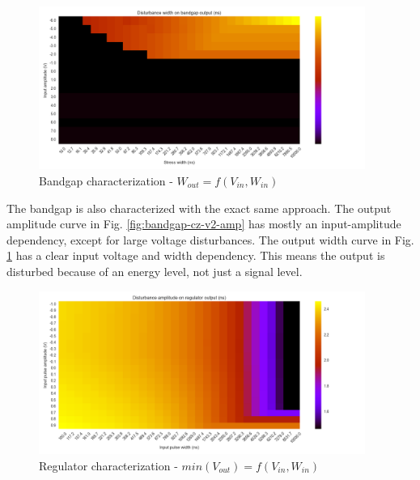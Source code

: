 \begin{figure}[!htb]
  \centering
  \includegraphics[width=0.95\textwidth]{src/4/figures/bandgap_cz_V2_width.png}
  \caption{Bandgap characterization - $W_{out} = f(V_{in}, W_{in})$}
  \label{fig:bandgap-cz-v2-width}
\end{figure}

The bandgap is also characterized with the exact same approach.
The output amplitude curve in Fig. \ref{fig:bandgap-cz-v2-amp} has mostly an input-amplitude dependency, except for large voltage disturbances.
The output width curve in Fig. \ref{fig:bandgap-cz-v2-width} has a clear input voltage and width dependency.
This means the output is disturbed because of an energy level, not just a signal level.

\begin{figure}[!htb]
  \centering
  \includegraphics[width=0.95\textwidth]{src/4/figures/regulator_cz_V2_amplitude.png}
  \caption{Regulator characterization - $min(V_{out}) = f(V_{in}, W_{in})$}
  \label{fig:reg-cz-v2-amp}
\end{figure}

